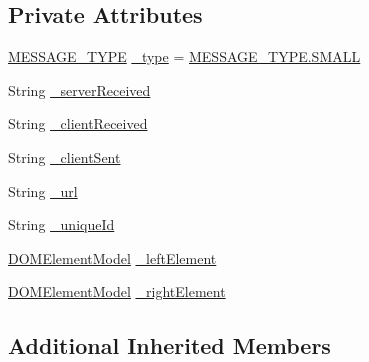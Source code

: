 \subsection*{Private Attributes}
\begin{DoxyCompactItemize}
\item 
\hyperlink{class_web_analyzer_1_1_models_1_1_message_model_1_1_in_data_message_a5c01620a5429c5eec75477e614c96f94}{M\+E\+S\+S\+A\+G\+E\+\_\+\+T\+Y\+P\+E} \hyperlink{class_web_analyzer_1_1_models_1_1_message_model_1_1_in_data_message_a4ec7837996a85d6843efb68bb7a7212f}{\+\_\+type} = \hyperlink{class_web_analyzer_1_1_models_1_1_message_model_1_1_in_data_message_a5c01620a5429c5eec75477e614c96f94a9b9c17e13f0e3dc9860a26e08b59b2a7}{M\+E\+S\+S\+A\+G\+E\+\_\+\+T\+Y\+P\+E.\+S\+M\+A\+L\+L}
\item 
String \hyperlink{class_web_analyzer_1_1_models_1_1_message_model_1_1_in_data_message_ae7aa4bcdfbb85dea10b2bd9eb2065e55}{\+\_\+server\+Received}
\item 
String \hyperlink{class_web_analyzer_1_1_models_1_1_message_model_1_1_in_data_message_a2cc19c547d536622b261fc8798e59dca}{\+\_\+client\+Received}
\item 
String \hyperlink{class_web_analyzer_1_1_models_1_1_message_model_1_1_in_data_message_ae2ac2367bd8e3d621aec791d923481f5}{\+\_\+client\+Sent}
\item 
String \hyperlink{class_web_analyzer_1_1_models_1_1_message_model_1_1_in_data_message_a8043e2e1b5fabe11fdcfe0c5dc2fee68}{\+\_\+url}
\item 
String \hyperlink{class_web_analyzer_1_1_models_1_1_message_model_1_1_in_data_message_a65f5749322bf4e7ac43c6a4bf2702a55}{\+\_\+unique\+Id}
\item 
\hyperlink{class_web_analyzer_1_1_models_1_1_data_model_1_1_d_o_m_element_model}{D\+O\+M\+Element\+Model} \hyperlink{class_web_analyzer_1_1_models_1_1_message_model_1_1_in_data_message_a95db3eadcb298b75ea183c5bbf042a57}{\+\_\+left\+Element}
\item 
\hyperlink{class_web_analyzer_1_1_models_1_1_data_model_1_1_d_o_m_element_model}{D\+O\+M\+Element\+Model} \hyperlink{class_web_analyzer_1_1_models_1_1_message_model_1_1_in_data_message_a888d6b4c7153dd3e469cd963567fb7c7}{\+\_\+right\+Element}
\end{DoxyCompactItemize}
\subsection*{Additional Inherited Members}


